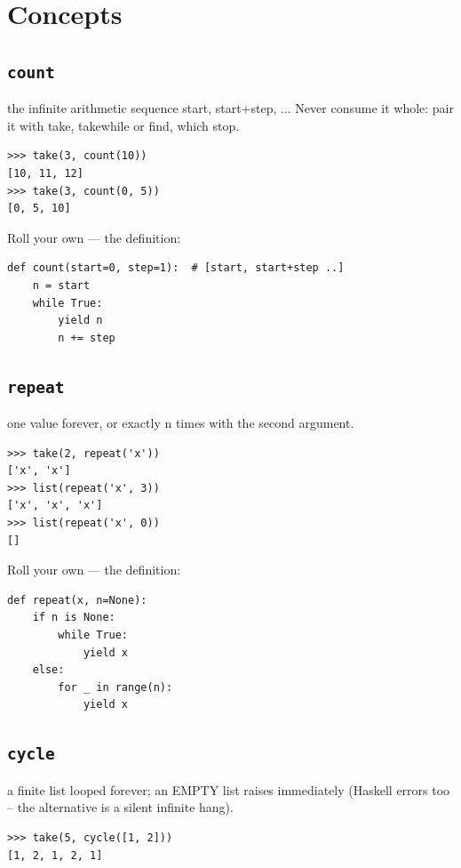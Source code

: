 \documentclass[10pt,letterpaper]{book}
\begin{document}
\section{Concepts}
\subsection{\texttt{count}}\label{def:count}
the infinite arithmetic sequence start, start+step, ... Never consume it whole: pair it with take, takewhile or find, which stop.
\begin{lstlisting}[style=ex]
>>> take(3, count(10))
[10, 11, 12]
>>> take(3, count(0, 5))
[0, 5, 10]
\end{lstlisting}

Roll your own --- the definition:

\begin{lstlisting}[style=ex]
def count(start=0, step=1):  # [start, start+step ..]
    n = start
    while True:
        yield n
        n += step
\end{lstlisting}

\subsection{\texttt{repeat}}\label{def:repeat}
one value forever, or exactly n times with the second argument.
\begin{lstlisting}[style=ex]
>>> take(2, repeat('x'))
['x', 'x']
>>> list(repeat('x', 3))
['x', 'x', 'x']
>>> list(repeat('x', 0))
[]
\end{lstlisting}

Roll your own --- the definition:

\begin{lstlisting}[style=ex]
def repeat(x, n=None):
    if n is None:
        while True:
            yield x
    else:
        for _ in range(n):
            yield x
\end{lstlisting}

\subsection{\texttt{cycle}}\label{def:cycle}
a finite list looped forever; an EMPTY list raises immediately (Haskell errors too -- the alternative is a silent infinite hang).
\begin{lstlisting}[style=ex]
>>> take(5, cycle([1, 2]))
[1, 2, 1, 2, 1]
\end{lstlisting}
\end{document}
